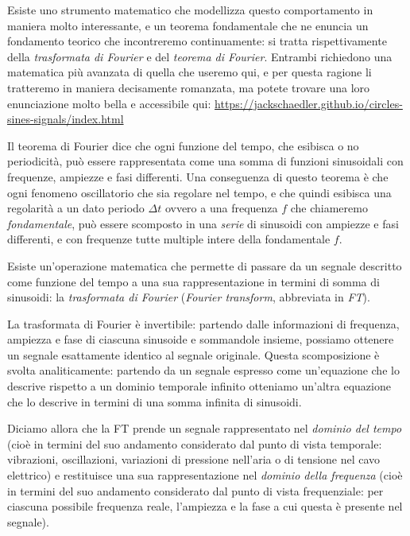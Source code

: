 \documentclass[11pt]{report}
\begin{document}
Esiste uno strumento matematico che modellizza questo comportamento in maniera molto interessante, e un teorema fondamentale che ne enuncia un fondamento teorico che incontreremo continuamente: si tratta rispettivamente della \emph{trasformata di Fourier} e del \emph{teorema di Fourier}. Entrambi richiedono una matematica più avanzata di quella che useremo qui, e per questa ragione li tratteremo in maniera decisamente romanzata, ma potete trovare una loro enunciazione molto bella e accessibile qui: \url{https://jackschaedler.github.io/circles-sines-signals/index.html}

Il teorema di Fourier dice che ogni funzione del tempo, che esibisca o no periodicità, può essere rappresentata come una somma di funzioni sinusoidali con frequenze, ampiezze e fasi differenti. Una conseguenza di questo teorema è che ogni fenomeno oscillatorio che sia regolare nel tempo, e che quindi esibisca una regolarità a un dato periodo $\Delta t$ ovvero a una frequenza $f$ che chiameremo \emph{fondamentale}, può essere scomposto in una \emph{serie} di sinusoidi con ampiezze e fasi differenti, e con frequenze tutte multiple intere della fondamentale $f$.

Esiste un'operazione matematica che permette di passare da un segnale descritto come funzione del tempo a una sua rappresentazione in termini di somma di sinusoidi: la \emph{trasformata di Fourier} (\emph{Fourier transform}, abbreviata in \emph{FT}).

La trasformata di Fourier è invertibile: partendo dalle informazioni di frequenza, ampiezza e fase di ciascuna sinusoide e sommandole insieme, possiamo ottenere un segnale esattamente identico al segnale originale. Questa scomposizione è svolta analiticamente: partendo da un segnale espresso come un'equazione che lo descrive rispetto a un dominio temporale infinito otteniamo un'altra equazione che lo descrive in termini di una somma infinita di sinusoidi.%

Diciamo allora che la FT prende un segnale rappresentato nel \emph{dominio del tempo} (cioè in termini del suo andamento considerato dal punto di vista temporale: vibrazioni, oscillazioni, variazioni di pressione nell'aria o di tensione nel cavo elettrico) e restituisce una sua rappresentazione nel \emph{dominio della frequenza} (cioè in termini del suo andamento considerato dal punto di vista frequenziale: per ciascuna possibile frequenza reale, l'ampiezza e la fase a cui questa è presente nel segnale).
\end{document}
